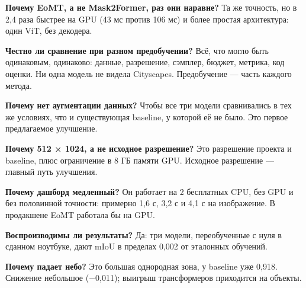 \documentclass[11pt,a4paper]{article}
\begin{document}
\textbf{Почему EoMT, а не Mask2Former, раз они наравне?}
Та же точность, но в 2,4 раза быстрее на GPU (43 мс против 106 мс) и более простая архитектура: один ViT, без декодера.

\textbf{Честно ли сравнение при разном предобучении?}
Всё, что могло быть одинаковым, одинаково: данные, разрешение, сэмплер, бюджет, метрика, код оценки. Ни одна модель не видела Cityscapes. Предобучение — часть каждого метода.

\textbf{Почему нет аугментации данных?}
Чтобы все три модели сравнивались в тех же условиях, что и существующая baseline, у которой её не было. Это первое предлагаемое улучшение.

\textbf{Почему 512 × 1024, а не исходное разрешение?}
Это разрешение проекта и baseline, плюс ограничение в 8 ГБ памяти GPU. Исходное разрешение — главный путь улучшения.

\textbf{Почему дашборд медленный?}
Он работает на 2 бесплатных CPU, без GPU и без половинной точности: примерно 1,6 с, 3,2 с и 4,1 с на изображение. В продакшене EoMT работала бы на GPU.

\textbf{Воспроизводимы ли результаты?}
Да: три модели, переобученные с нуля в сданном ноутбуке, дают mIoU в пределах 0,002 от эталонных обучений.

\textbf{Почему падает небо?}
Это большая однородная зона, у baseline уже 0,918. Снижение небольшое (−0,011); выигрыш трансформеров приходится на объекты.
\end{document}
